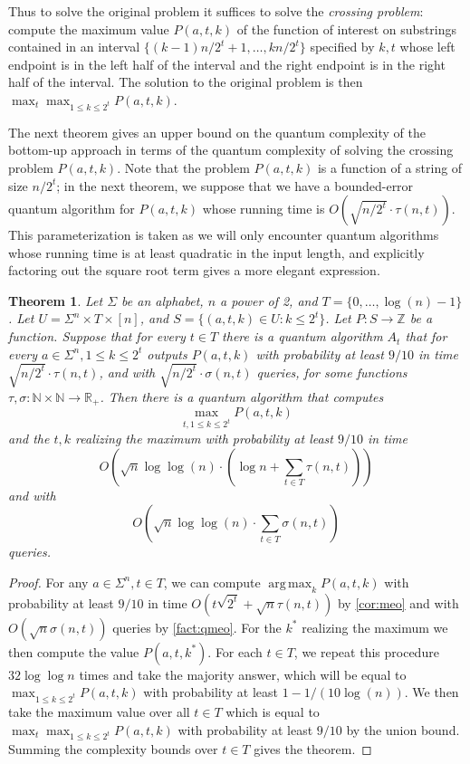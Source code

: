 \documentclass[12pt]{article}
\newcommand{\N}{\mathbb{N}}
\newcommand{\R}{\mathbb{R}}
\newcommand{\Z}{\mathbb{Z}}
\DeclareMathOperator*{\argmax}{arg\,max}
\newtheorem{theorem}{Theorem}
\theoremstyle{definition}
\begin{document}
Thus to solve the original problem it suffices to solve the \emph{crossing problem}: compute the maximum value $P(a, t, k)$ of the function of interest on substrings contained in an interval $\{(k-1)n/2^t+1, \ldots, kn/2^t\}$ specified by $k,t$ whose left endpoint is in the left half of the interval and the right endpoint is in the right half of the interval. 
The solution to the original problem is then $\max_t \max_{1 \le k \le 2^t} P(a, t, k)$.

The next theorem gives an upper bound on the quantum complexity of the bottom-up approach in terms of the quantum complexity of solving the crossing problem $P(a, t, k)$. 
Note that the problem $P(a, t, k)$ is a function of a string of size $n/2^t$; in the next theorem, we suppose that we have a bounded-error quantum algorithm for $P(a, t, k)$ whose running time is $O(\sqrt{n/2^t} \cdot \tau(n, t))$.  This parameterization is taken as we will only encounter quantum algorithms whose running time is at least quadratic in the input length, and explicitly factoring out the square root term gives a more elegant expression.
\begin{theorem}
\label{thm:bu_easy}
Let $\Sigma$ be an alphabet, $n$ a power of 2, and $T = \{0, \ldots, \log(n) - 1\}$.
Let $U = \Sigma^n \times T \times [n]$, and $S = \{(a, t, k) \in U : k \le 2^t\}$.
Let $P : S \rightarrow \Z$ be a function. 
Suppose that for every $t \in T$ there is a quantum algorithm $A_t$ that for every $a \in \Sigma^n, 1 \le k \le 2^t$ outputs $P(a, t, k)$ with probability at least $9/10$ in time $\sqrt{n/2^t} \cdot \tau(n, t)$, and with $\sqrt{n/2^t} \cdot \sigma(n, t)$ queries, for some functions 
$\tau, \sigma :\N \times \N \rightarrow \R_+$.
Then there is a quantum algorithm that computes 
\[
\max_{t, 1 \le k \le 2^t} P(a, t, k)
\]
and the $t,k$ realizing the maximum with probability at least $9/10$ in time 
\[
O(\sqrt{n} \log \log(n) \cdot (\log n + \sum_{t \in T} \tau(n, t)))
\]
and with
\[
O(\sqrt{n} \log \log(n) \cdot \sum_{t \in T} \sigma(n, t))
\]
queries.
\end{theorem}

\begin{proof}
For any $a \in \Sigma^n, t \in T$, we can compute $\argmax_k P(a,t,k)$ with probability at least $9/10$ in time $O(t\sqrt{2^t} + \sqrt{n}\tau(n, t))$ by \cref{cor:meo} and with 
$O(\sqrt{n} \sigma(n, t))$ queries by \cref{fact:qmeo}. 
For the $k^*$ realizing the maximum we then compute the value $P(a, t, k^*)$.
For each $t \in T$, we repeat this procedure $32 \log \log n$ times and take the majority answer, which will be equal to $\max_{1 \le k \le 2^t} P(a, t, k)$ with probability at least
$1 - 1/(10 \log(n))$. We then take the maximum value over all $t \in T$ which is equal to $\max_t \max_{1 \le k \le 2^t} P(a, t, k)$ with probability at least $9/10$ by the union bound. 
Summing the complexity bounds over $t \in T$ gives the theorem.
\end{proof}
\end{document}
